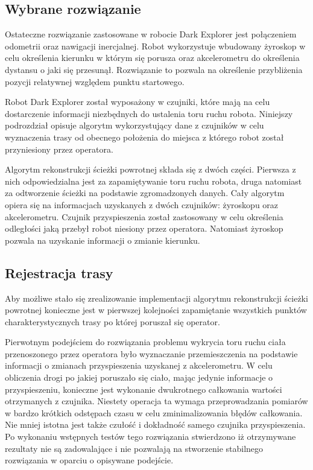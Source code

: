 \subsection{Wybrane rozwiązanie}
Ostateczne rozwiązanie zastosowane w robocie Dark Explorer jest połączeniem odometrii oraz nawigacji inercjalnej. Robot wykorzystuje wbudowany żyroskop w celu określenia kierunku w którym się porusza oraz akcelerometru do określenia dystansu o jaki się przesunął. Rozwiązanie to pozwala na określenie przybliżenia pozycji relatywnej względem punktu startowego. 

Robot Dark Explorer został wyposażony w czujniki, które mają na celu dostarczenie
informacji niezbędnych do ustalenia toru ruchu robota. Niniejszy podrozdział
opisuje algorytm wykorzystujący dane z czujników w celu wyznaczenia trasy od
obecnego położenia do miejsca z którego robot został przyniesiony przez
operatora.

Algorytm rekonstrukcji ścieżki powrotnej składa się z dwóch części. Pierwsza z
nich odpowiedzialna jest za zapamiętywanie toru ruchu robota, druga natomiast za
odtworzenie ścieżki na podstawie zgromadzonych danych. Cały algorytm opiera się
na informacjach uzyskanych z dwóch czujników: żyroskopu oraz akcelerometru.
Czujnik przyspieszenia został zastosowany w celu określenia odległości jaką
przebył robot niesiony przez operatora. Natomiast żyroskop pozwala na uzyskanie
informacji o zmianie kierunku.

\subsection{Rejestracja trasy}
Aby możliwe stało się zrealizowanie implementacji algorytmu rekonstrukcji
ścieżki powrotnej konieczne jest w pierwszej kolejności zapamiętanie wszystkich
punktów charakterystycznych trasy po której poruszał się operator.

Pierwotnym podejściem do rozwiązania problemu wykrycia toru ruchu ciała
przenoszonego przez operatora było wyznaczanie przemieszczenia na
podstawie informacji o zmianach przyspieszenia uzyskanej z akcelerometru.
W celu obliczenia drogi po jakiej poruszało się ciało, mając jedynie informacje 
o przyspieszeniu, konieczne jest wykonanie dwukrotnego całkowania wartości 
otrzymanych z czujnika. Niestety operacja ta wymaga przeprowadzania pomiarów w
bardzo krótkich odstępach czasu w celu zminimalizowania błędów całkowania.
Nie mniej istotna jest także czułość i dokładność samego czujnika
przyspieszenia. Po wykonaniu wstępnych testów tego rozwiązania stwierdzono iż
otrzymywane rezultaty nie są zadowalające  i nie pozwalają na stworzenie
stabilnego rozwiązania w oparciu o opisywane podejście. 

